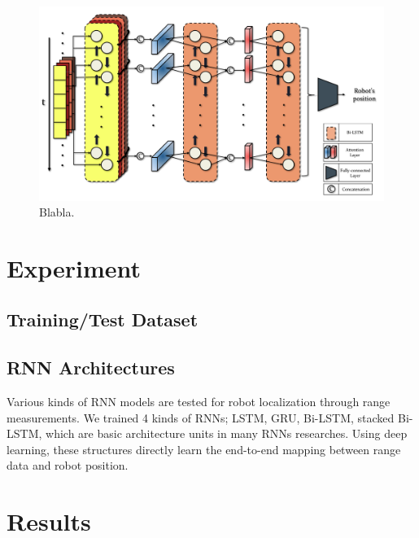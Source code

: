 \documentclass[letterpaper, 10 pt, conference]{ieeeconf}  %
\begin{document}
\begin{figure}[t]
	
	\centering
	\includegraphics[height=10.2 cm]{CE554_networks}
	
	\label{fig:example}
	
	\caption{Blabla. }
	
\end{figure}

\section{Experiment}
\subsection{Training/Test Dataset}
 

\subsection{RNN Architectures}

Various kinds of RNN models are tested for robot localization through range measurements. We trained 4 kinds of RNNs; LSTM\cite{hochreiter1997long}, GRU\cite{cho2014learning}, Bi-LSTM\cite{schuster1997bidirectional}, stacked Bi-LSTM, which are basic architecture units in many RNNs researches. Using deep learning, these structures directly learn the end-to-end mapping between range data and robot position. 

\section{Results}
\end{document}
